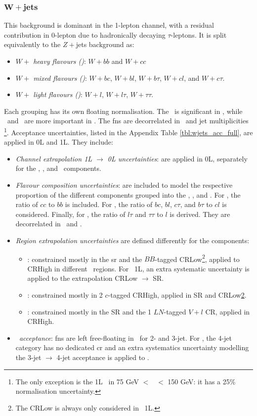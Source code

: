 \subsubsection{$\boldsymbol{W+}$jets}
This background is dominant in the 1-lepton channel, with a residual contribution in 0-lepton due to hadronically decaying $\tau$-leptons. It is split equivalently to the $Z+$jets background as:   
\begin{itemize}
    \item \textit{$W+$ heavy flavours (\whf)}: $W+bb$ and $W+cc$
    \item \textit{$W+$ mixed flavours (\wmf)}: $W+bc$, $W+bl$, $W+b\tau$, $W+cl$, and $W+c\tau$.
    \item \textit{$W+$ light flavours (\wlf)}: $W+l$, $W+l\tau$, $W+\tau\tau$.
\end{itemize}
Each grouping has its own floating normalisation. The \whf\ is significant in \vhb, while \wmf\ and \wlf\ are more important in \vhc. The \glspl{fn} are decorrelated in \ptv\ and jet multiplicities \nj\footnote{The only exception is the 1L \wlf\ in 75 GeV $<$ \ptv\ $<$ 150 GeV: it has a 25\% normalisation uncertainty.}. Acceptance uncertainties, listed in the Appendix Table \ref{tbl:wjets_acc_full}, are applied in 0L and 1L. They include:
\begin{itemize}[leftmargin=*]
    \item \textit{Channel extrapolation 1L $\rightarrow$ 0L uncertainties}: are applied in 0L, separately for the \whf, \wmf, and \wlf\ components. 
    \item \textit{Flavour composition uncertainties}: are included to model the respective proportion of the different components grouped into the \whf, \wmf, and \wlf. For \whf, the ratio of $cc$ to $bb$ is included. For \wmf, the ratio of $bc$, $bl$, $c\tau$, and $b\tau$ to $cl$ is considered. Finally, for  \wlf, the ratio of $l\tau$ and $\tau\tau$ to $l$ is derived. They are decorrelated in \ptv\ and \nj.
    \item \textit{Region extrapolation uncertainties} are defined differently for the components:
    \begin{itemize}
        \item \whf: constrained mostly in the \gls{sr} and the $BB$-tagged CRLow\footnote{\label{footnote-crlow}The CRLow is always only considered in \vhb\ 1L.}, applied to CRHigh in different \ptv\ regions. For \vhb\ 1L, an extra systematic uncertainty is applied to the extrapolation CRLow $\rightarrow$ SR. 
        \item \wmf: constrained mostly in 2 $c$-tagged CRHigh, applied in SR and CRLow\cref{footnote-crlow}.
        \item \wlf: constrained mostly in the SR and the 1 $LN$-tagged $V+l$ CR, applied in CRHigh. 
    \end{itemize}
    \item \textit{\nj\ acceptance}: \glspl{fn} are left free-floating in \nj\ for 2- and 3-jet. For \vhb, the 4-jet category has no dedicated \gls{cr} and an extra systematics uncertainty modelling the 3-jet $\rightarrow$ 4-jet acceptance is applied to \whf.
\end{itemize}
